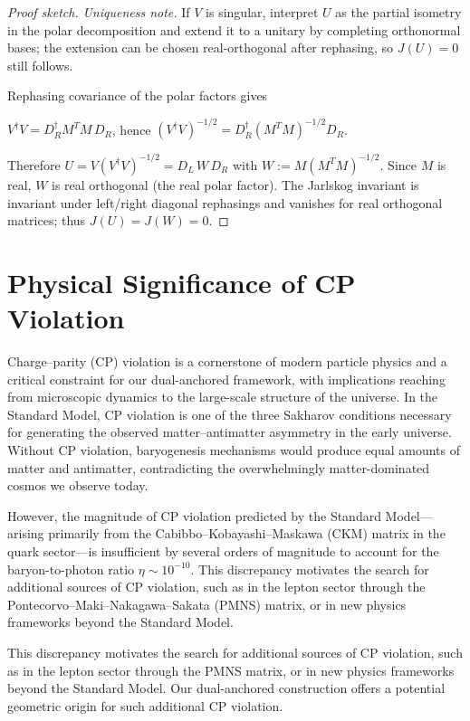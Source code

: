 \documentclass[11pt]{article}
\theoremstyle{plain}
\theoremstyle{definition}
\begin{document}
\begin{proof}[Proof sketch]

  \noindent\emph{Uniqueness note.} If $V$ is singular, interpret $U$ as the partial isometry in the polar decomposition and extend it to a unitary by completing orthonormal bases; the extension can be chosen real-orthogonal after rephasing, so $J(U)=0$ still follows.

  Rephasing covariance of the polar factors gives

  $V^\dagger V = D_R^\dagger M^T M\, D_R$, hence $(V^\dagger V)^{-1/2} = D_R^\dagger (M^T M)^{-1/2} D_R$.

  Therefore $U=V(V^\dagger V)^{-1/2}=D_L\,W\,D_R$ with $W:=M(M^T M)^{-1/2}$.
  Since $M$ is real, $W$ is real orthogonal (the real polar factor). The Jarlskog invariant is invariant under left/right diagonal rephasings and vanishes for real orthogonal matrices; thus $J(U)=J(W)=0$.
\end{proof}

\section{Physical Significance of CP Violation}

Charge–parity (CP) violation is a cornerstone of modern particle physics and a critical constraint for our dual-anchored framework, with implications reaching from microscopic dynamics to the large-scale structure of the universe. In the Standard Model, CP violation is one of the three Sakharov conditions necessary for generating the observed matter–antimatter asymmetry in the early universe. Without CP violation, baryogenesis mechanisms would produce equal amounts of matter and antimatter, contradicting the overwhelmingly matter-dominated cosmos we observe today.

However, the magnitude of CP violation predicted by the Standard Model---arising primarily from the Cabibbo–Kobayashi–Maskawa (CKM) matrix in the quark sector---is insufficient by several orders of magnitude to account for the baryon-to-photon ratio $\eta \sim 10^{-10}$. This discrepancy motivates the search for additional sources of CP violation, such as in the lepton sector through the Pontecorvo–Maki–Nakagawa–Sakata (PMNS) matrix, or in new physics frameworks beyond the Standard Model.

This discrepancy motivates the search for additional sources of CP violation, such as in the lepton sector through the PMNS matrix, or in new physics frameworks beyond the Standard Model. Our dual-anchored construction offers a potential geometric origin for such additional CP violation.
\end{document}
